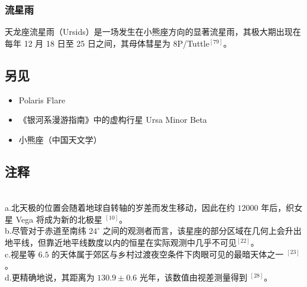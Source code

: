 \subsubsection{流星雨}  
天龙座流星雨（Ursids）是一场发生在小熊座方向的显著流星雨，其极大期出现在每年 12 月 18 日至 25 日之间，其母体彗星为 8P/Tuttle$^{[79]}$。
\subsection{另见}  
\begin{itemize}
\item Polaris Flare  
\item 《银河系漫游指南》中的虚构行星 Ursa Minor Beta  
\item 小熊座（中国天文学）
\end{itemize}
\subsection{注释}\\
a.北天极的位置会随着地球自转轴的岁差而发生移动，因此在约 $12000$ 年后，织女星 Vega 将成为新的北极星 $^{[10]}$。\\  
b.尽管对于赤道至南纬 $24^\circ$ 之间的观测者而言，该星座的部分区域在几何上会升出地平线，但靠近地平线数度以内的恒星在实际观测中几乎不可见$^{[22]}$。 \\ 
c.视星等 $6.5$ 的天体属于郊区与乡村过渡夜空条件下肉眼可见的最暗天体之一 $^{[23]}$。\\  
d.更精确地说，其距离为 $130.9\pm0.6$ 光年，该数值由视差测量得到 $^{[28]}$。
